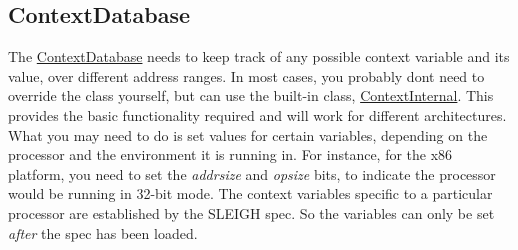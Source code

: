 \begin{DoxyCode}{0}
\DoxyCodeLine{\textcolor{keyword}{public}:}
\DoxyCodeLine{\};}
\end{DoxyCode}
\hypertarget{sleigh_a_p_ibasic_sleighcontext}{}\subsection{Context\+Database}\label{sleigh_a_p_ibasic_sleighcontext}
The \mbox{\hyperlink{class_context_database}{Context\+Database}} needs to keep track of any possible context variable and its value, over different address ranges. In most cases, you probably don\textquotesingle{}t need to override the class yourself, but can use the built-\/in class, \mbox{\hyperlink{class_context_internal}{Context\+Internal}}. This provides the basic functionality required and will work for different architectures. What you may need to do is set values for certain variables, depending on the processor and the environment it is running in. For instance, for the x86 platform, you need to set the {\itshape addrsize} and {\itshape opsize} bits, to indicate the processor would be running in 32-\/bit mode. The context variables specific to a particular processor are established by the S\+L\+E\+I\+GH spec. So the variables can only be set {\itshape after} the spec has been loaded.


